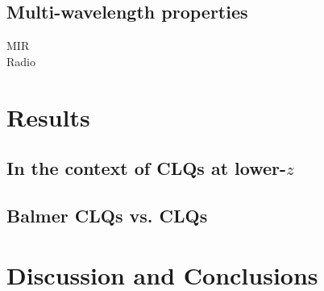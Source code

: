 \documentclass[a4paper,fleqn,usenatbib]{mnras}
\begin{document}
\subsection{Multi-wavelength properties}
MIR \\
Radio \\



\section{Results}
\subsection{In the context of CLQs at lower-$z$}

\subsection{Balmer CLQs vs. \civ CLQs}


\section{Discussion and Conclusions}





\bsp	%
\label{lastpage}
\end{document}

